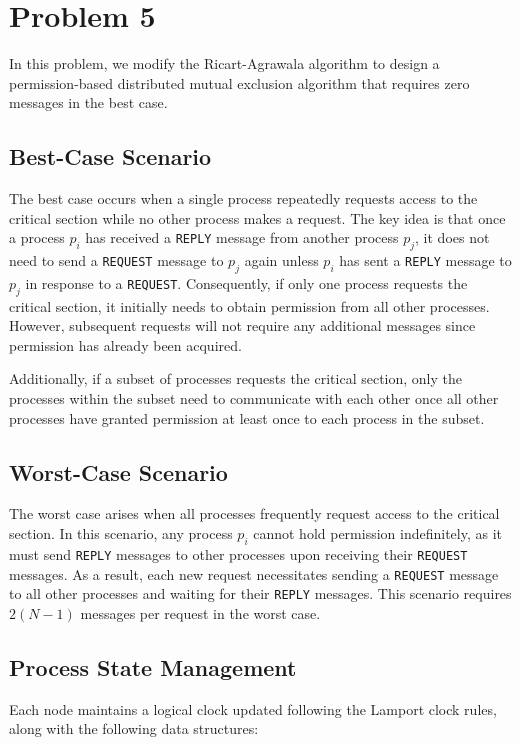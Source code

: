 \section{Problem 5}\label{prob5}

In this problem, we modify the Ricart-Agrawala algorithm to design a permission-based distributed mutual exclusion algorithm that requires zero messages in the best case.

\subsection{Best-Case Scenario}
The best case occurs when a single process repeatedly requests access to the critical section while no other process makes a request. The key idea is that once a process \( p_i \) has received a \texttt{REPLY} message from another process \( p_j \), it does not need to send a \texttt{REQUEST} message to \( p_j \) again unless \( p_i \) has sent a \texttt{REPLY} message to \( p_j \) in response to a \texttt{REQUEST}. Consequently, if only one process requests the critical section, it initially needs to obtain permission from all other processes. However, subsequent requests will not require any additional messages since permission has already been acquired.

Additionally, if a subset of processes requests the critical section, only the processes within the subset need to communicate with each other once all other processes have granted permission at least once to each process in the subset.

\subsection{Worst-Case Scenario}
The worst case arises when all processes frequently request access to the critical section. In this scenario, any process \( p_i \) cannot hold permission indefinitely, as it must send \texttt{REPLY} messages to other processes upon receiving their \texttt{REQUEST} messages. As a result, each new request necessitates sending a \texttt{REQUEST} message to all other processes and waiting for their \texttt{REPLY} messages. This scenario requires \( 2(N-1) \) messages per request in the worst case.

\subsection{Process State Management}
Each node maintains a logical clock updated following the Lamport clock rules, along with the following data structures:

